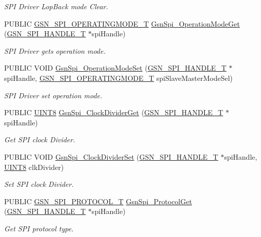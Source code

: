 \begin{DoxyCompactItemize}
\begin{DoxyCompactList}\small\item\em SPI Driver LopBack mode Clear. \end{DoxyCompactList}\item 
PUBLIC \hyperlink{a00655_ga6621383791d81630bc4c294a7a3d292d}{GSN\_\-SPI\_\-OPERATINGMODE\_\-T} \hyperlink{a00655_gac78c8ee2b4d5b86c326b8e2f86be0d40}{GsnSpi\_\-OperationModeGet} (\hyperlink{a00238}{GSN\_\-SPI\_\-HANDLE\_\-T} $\ast$spiHandle)
\begin{DoxyCompactList}\small\item\em SPI Driver gets operation mode. \end{DoxyCompactList}\item 
PUBLIC VOID \hyperlink{a00655_ga4666c9a37c13c62920c60a4f31bad269}{GsnSpi\_\-OperationModeSet} (\hyperlink{a00238}{GSN\_\-SPI\_\-HANDLE\_\-T} $\ast$spiHandle, \hyperlink{a00655_ga6621383791d81630bc4c294a7a3d292d}{GSN\_\-SPI\_\-OPERATINGMODE\_\-T} spiSlaveMasterModeSel)
\begin{DoxyCompactList}\small\item\em SPI Driver set operation mode. \end{DoxyCompactList}\item 
PUBLIC \hyperlink{a00660_gab27e9918b538ce9d8ca692479b375b6a}{UINT8} \hyperlink{a00655_gaab2811f77e6b6fe2e6d503dcc929c2a7}{GsnSpi\_\-ClockDividerGet} (\hyperlink{a00238}{GSN\_\-SPI\_\-HANDLE\_\-T} $\ast$spiHandle)
\begin{DoxyCompactList}\small\item\em Get SPI clock Divider. \end{DoxyCompactList}\item 
PUBLIC VOID \hyperlink{a00655_gafc15df71ec9f7424598101b21a4edf02}{GsnSpi\_\-ClockDividerSet} (\hyperlink{a00238}{GSN\_\-SPI\_\-HANDLE\_\-T} $\ast$spiHandle, \hyperlink{a00660_gab27e9918b538ce9d8ca692479b375b6a}{UINT8} clkDivider)
\begin{DoxyCompactList}\small\item\em Set SPI clock Divider. \end{DoxyCompactList}\item 
PUBLIC \hyperlink{a00655_gafc404344d5f8c6a8358fa3be07a87444}{GSN\_\-SPI\_\-PROTOCOL\_\-T} \hyperlink{a00655_gad415af0ada6d0c1923a5f75f6dc728de}{GsnSpi\_\-ProtocolGet} (\hyperlink{a00238}{GSN\_\-SPI\_\-HANDLE\_\-T} $\ast$spiHandle)
\begin{DoxyCompactList}\small\item\em Get SPI protocol type. \end{DoxyCompactList}\item 

\end{DoxyCompactItemize}
